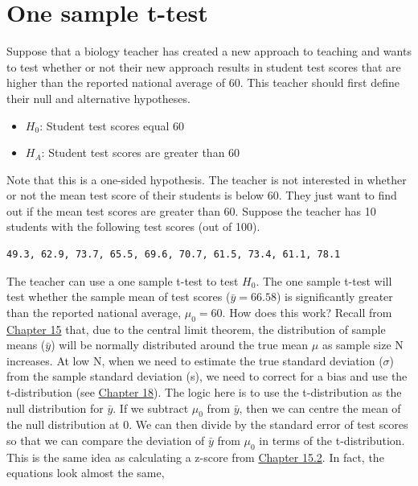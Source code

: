 \documentclass[
]{scrbook}
\providecommand{\tightlist}{%
  \setlength{\itemsep}{0pt}\setlength{\parskip}{0pt}}
\begin{document}
\hypertarget{one-sample-t-test}{%
\section{One sample t-test}\label{one-sample-t-test}}

Suppose that a biology teacher has created a new approach to teaching and wants to test whether or not their new approach results in student test scores that are higher than the reported national average of 60.
This teacher should first define their null and alternative hypotheses.

\begin{itemize}
\tightlist
\item
  \(H_{0}\): Student test scores equal 60
\item
  \(H_{A}\): Student test scores are greater than 60
\end{itemize}

Note that this is a one-sided hypothesis.
The teacher is not interested in whether or not the mean test score of their students is below 60.
They just want to find out if the mean test scores are greater than 60.
Suppose the teacher has 10 students with the following test scores (out of 100).

\begin{verbatim}
49.3, 62.9, 73.7, 65.5, 69.6, 70.7, 61.5, 73.4, 61.1, 78.1
\end{verbatim}

The teacher can use a one sample t-test to test \(H_{0}\).
The one sample t-test will test whether the sample mean of test scores (\(\bar{y} = 66.58\)) is significantly greater than the reported national average, \(\mu_{0} = 60\).
How does this work?
Recall from \protect\hyperlink{Chapter_15}{Chapter 15} that, due to the central limit theorem, the distribution of sample means (\(\bar{y}\)) will be normally distributed around the true mean \(\mu\) as sample size N increases.
At low N, when we need to estimate the true standard deviation (\(\sigma\)) from the sample standard deviation (s), we need to correct for a bias and use the t-distribution (see \protect\hyperlink{Chapter_18}{Chapter 18}).
The logic here is to use the t-distribution as the null distribution for \(\bar{y}\).
If we subtract \(\mu_{0}\) from \(\bar{y}\), then we can centre the mean of the null distribution at 0.
We can then divide by the standard error of test scores so that we can compare the deviation of \(\bar{y}\) from \(\mu_{0}\) in terms of the t-distribution.
This is the same idea as calculating a z-score from \protect\hyperlink{probability-and-z-scores}{Chapter 15.2}.
In fact, the equations look almost the same,
\end{document}
